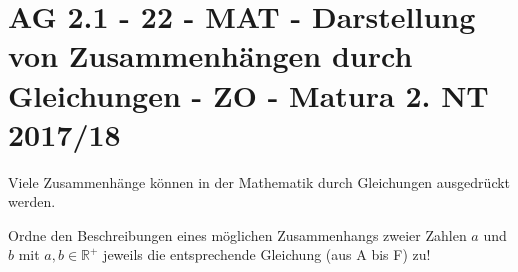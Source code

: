 \section{AG 2.1 - 22 - MAT - Darstellung von Zusammenhängen durch Gleichungen - ZO - Matura 2. NT 2017/18}

\begin{beispiel}[AG 2.1]{1}
Viele Zusammenhänge können in der Mathematik durch Gleichungen ausgedrückt werden.

Ordne den Beschreibungen eines möglichen Zusammenhangs zweier Zahlen $a$ und $b$ mit $a, b \in \mathbb{R}^+$ jeweils die entsprechende Gleichung (aus A bis F) zu!

\end{beispiel}